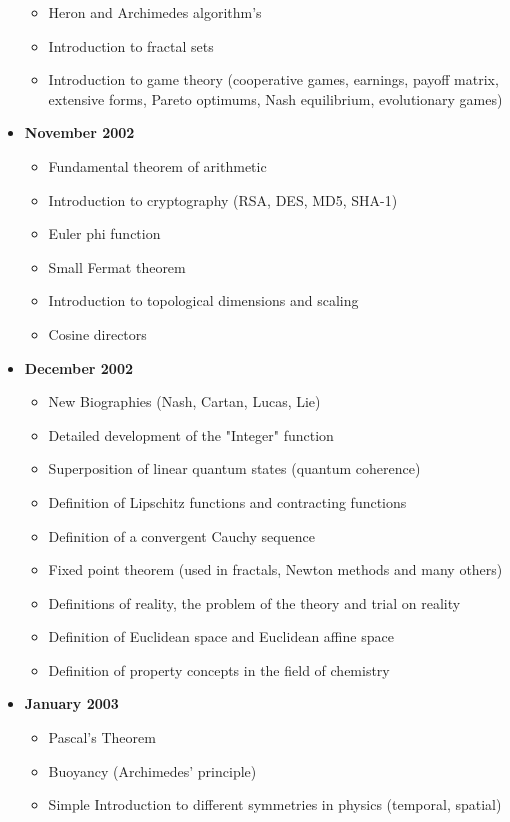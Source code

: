 \documentclass[12pt,a4paper,twoside,openright]{report}
\theoremstyle{definition}
\theoremstyle{itexmp}
\numberwithin{equation}{section}
\begin{document}
\begin{itemize}
\begin{itemize}[noitemsep]
				\item Heron and Archimedes algorithm's
				\item Introduction to fractal sets
				\item Introduction to game theory (cooperative games, earnings, payoff matrix, extensive forms, Pareto optimums, Nash equilibrium, evolutionary games)
			\end{itemize}
		\item \textbf{November 2002}
			\begin{itemize}[noitemsep]
			\item Fundamental theorem of arithmetic
			\item Introduction to cryptography (RSA, DES, MD5, SHA-1)
			\item Euler phi function
			\item Small Fermat theorem
			\item Introduction to topological dimensions and scaling 
			\item Cosine directors
		\end{itemize}
		\item \textbf{December 2002}
			\begin{itemize}[noitemsep]
			\item New Biographies (Nash, Cartan, Lucas, Lie)
			\item Detailed development of the "Integer" function
			\item Superposition of linear quantum states (quantum coherence) 
			\item Definition of Lipschitz functions and contracting functions 
			\item Definition of a convergent Cauchy sequence 
			\item Fixed point theorem (used in fractals, Newton methods and many others)
			\item Definitions of reality, the problem of the theory and trial on reality
			\item Definition of Euclidean space and Euclidean affine space
			\item Definition of property concepts in the field of chemistry
		\end{itemize}
		\item \textbf{January 2003}
		\begin{itemize}[noitemsep]
			\item Pascal's Theorem
			\item Buoyancy (Archimedes' principle)
			\item Simple Introduction to different symmetries in physics (temporal, spatial)

\end{itemize}
\end{itemize}
\end{document}
